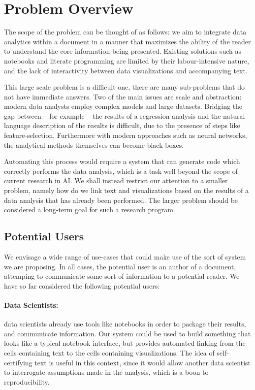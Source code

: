 \section{Problem Overview}
\label{sec:overview}

The scope of the problem can be thought of as follows: we aim to integrate data analytics within a document in
a manner that maximizes the ability of the reader to understand the core information being presented. Existing
solutions such as notebooks and literate programming are limited by their labour-intensive nature, and the
lack of interactivity between data visualizations and accompanying text.

This large scale problem is a difficult one, there are many sub-problems that do not have immediate answers.
Two of the main issues are scale and abstraction: modern data analysts employ complex models and large
datasets. Bridging the gap between -- for example -- the results of a regression analysis and the natural
language description of the results is difficult, due to the presence of steps like feature-selection.
Furthermore with modern approaches such as neural networks, the analytical methods themselves can become
black-boxes.

Automating this process would require a system that can generate code which correctly performs the data
analysis, which is a task well beyond the scope of current research in AI. We shall instead restrict our
attention to a smaller problem, namely how do we link text and visualizations based on the results of a data
analysis that has already been performed. The larger problem should be considered a long-term goal for such a
research program.

\subsection{Potential Users}
We envisage a wide range of use-cases that could make use of the sort of system we are proposing. In all
cases, the potential user is an author of a document, attemping to communicate some sort of information to a
potential reader. We have so far considered the following potential users:

\paragraph{Data Scientists:} data scientists already use tools like notebooks in order to package their
results, and communicate information. Our system could be used to build something that looks like a typical
notebook interface, but provides automated linking from the cells containing text to the cells containing
visualizations. The idea of self-certifying text is useful in this context, since it would allow another data
scientist to interrogate assumptions made in the analysis, which is a boon to reproducibility.

